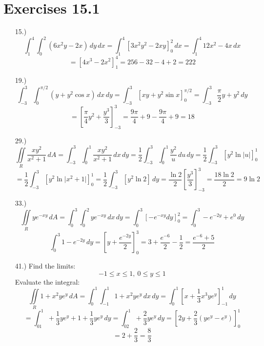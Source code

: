 \documentclass[12pt]{article}
\newcommand{\bracks}[1]{\left[#1\right]}
\newcommand{\parns}[1]{\left(#1\right)}
\begin{document}
\pagestyle{fancy}
\fancyhead{}

\normalsize
\section*{Exercises 15.1}
\begin{itemize}
    \item [15.)] \[\int^4_1\int^2_0\left(6x^2y-2x\right)\,dy\,dx=\int_{1}^{4}\bracks{3x^2y^2-2xy}^2_0\,dx=\int_{1}^{4}12x^2-4x\,dx\]
    \[=\bracks{4x^3-2x^2}^4_1=256-32-4+2=222\]

    \item [19.)] \[\int^3_{-3}\int^{\pi/2}_0(y+y^2\cos x)\,dx\,dy=\int^3_{-3}\bracks{xy+y^2\sin x}^{\pi/2}_0=\int^3_{-3}\frac{\pi}{2}y+y^2\,dy\]
    \[=\bracks{\frac{\pi}{4}y^2+\frac{y^3}{3}}^3_{-3}=\frac{9\pi}{4}+9-\frac{9\pi}{4}+9=18\]

    \item [29.)] \[\iint\limits_R\frac{xy^2}{x^2+1}\,dA=\int^3_{-3}\int^1_0\frac{xy^2}{x^2+1}\,dx\,dy=\frac{1}{2}\int^3_{-3}\int^1_0\frac{y^2}{u}\,du\,dy=\frac{1}{2}\int^3_{-3}\bracks{y^2\ln\vert u\vert}^1_0\]
    \[=\frac{1}{2}\int^3_{-3}\bracks{y^2\ln\vert x^2+1\vert}^1_0=\frac{1}{2}\int^3_{-3}\bracks{y^2\ln2}\,dy=\frac{\ln2}{2}\bracks{\frac{y^3}{3}}^3_{-3}=\frac{18\ln2}{2}=9\ln2\]

    \item [33.)] \[\iint\limits_Rye^{-xy}\,dA=\int^3_0\int^2_0ye^{-xy}\,dx\,dy=\int^3_0\bracks{-e^{-xy}dy}^2_0=\int^3_{0}-e^{-2y}+e^0\,dy\]
    \[\int^3_{0}1-e^{-2y}\,dy=\bracks{y+\frac{e^{-2y}}{2}}^3_0=3+\frac{e^{-6}}{2}-\frac{1}{2}=\frac{e^{-6}+5}{2}\]

    \item [41.)] Find the limits:
    \[-1\leq x\leq1,\ 0\leq y\leq1\]
    Evaluate the integral:
    \[\iint\limits_R1+x^2ye^y\,dA=\int^1_0\int^1_{-1}1+x^2ye^y\,dx\,dy=\int^1_0\bracks{x+\frac{1}{3}x^3ye^y}^1_{-1}\,dy\]
    \[=\int^1_01+\frac{1}{3}ye^y+1+\frac{1}{3}ye^y\,dy=\int^1_02+\frac{2}{3}ye^y\,dy=\bracks{2y+\frac{2}{3}\parns{ye^y-e^y}}^1_0\]
    \[=2+\frac{2}{3}=\frac{8}{3}\]

\end{itemize}
\end{document}
